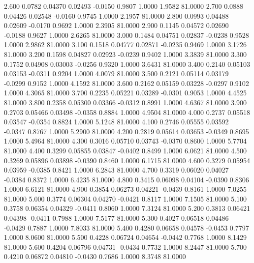    2.600   0.0782   0.04370   0.02493  -0.0150   0.9807   1.0000   1.9582  81.0000
   2.700   0.0888   0.04426   0.02548  -0.0160   0.9745   1.0000   2.1957  81.0000
   2.800   0.0993   0.04488   0.02609  -0.0170   0.9692   1.0000   2.3905  81.0000
   2.900   0.1145   0.04572   0.02690  -0.0188   0.9627   1.0000   2.6265  81.0000
   3.000   0.1484   0.04751   0.02837  -0.0238   0.9528   1.0000   2.9862  81.0000
   3.100   0.1518   0.04777   0.02871  -0.0235   0.9469   1.0000   3.1726  81.0000
   3.200   0.1598   0.04827   0.02923  -0.0239   0.9402   1.0000   3.3839  81.0000
   3.300   0.1752   0.04908   0.03003  -0.0256   0.9320   1.0000   3.6431  81.0000
   3.400   0.2140   0.05103   0.03153  -0.0311   0.9204   1.0000   4.0079  81.0000
   3.500   0.2121   0.05114   0.03179  -0.0299   0.9152   1.0000   4.1592  81.0000
   3.600   0.2162   0.05159   0.03228  -0.0297   0.9102   1.0000   4.3065  81.0000
   3.700   0.2235   0.05221   0.03289  -0.0301   0.9053   1.0000   4.4525  81.0000
   3.800   0.2358   0.05300   0.03366  -0.0312   0.8991   1.0000   4.6367  81.0000
   3.900   0.2703   0.05466   0.03498  -0.0358   0.8884   1.0000   4.9504  81.0000
   4.000   0.2737   0.05518   0.03547  -0.0354   0.8824   1.0000   5.1248  81.0000
   4.100   0.2746   0.05555   0.03592  -0.0347   0.8767   1.0000   5.2900  81.0000
   4.200   0.2819   0.05614   0.03653  -0.0349   0.8695   1.0000   5.4964  81.0000
   4.300   0.3016   0.05710   0.03743  -0.0370   0.8600   1.0000   5.7704  81.0000
   4.400   0.3299   0.05855   0.03847  -0.0402   0.8499   1.0000   6.0621  81.0000
   4.500   0.3269   0.05896   0.03898  -0.0390   0.8460   1.0000   6.1715  81.0000
   4.600   0.3279   0.05954   0.03959  -0.0385   0.8421   1.0000   6.2843  81.0000
   4.700   0.3319   0.06020   0.04027  -0.0384   0.8372   1.0000   6.4235  81.0000
   4.800   0.3415   0.06098   0.04104  -0.0390   0.8306   1.0000   6.6121  81.0000
   4.900   0.3854   0.06273   0.04221  -0.0439   0.8161   1.0000   7.0255  81.0000
   5.000   0.3774   0.06304   0.04270  -0.0421   0.8117   1.0000   7.1505  81.0000
   5.100   0.3758   0.06354   0.04329  -0.0411   0.8060   1.0000   7.3124  81.0000
   5.200   0.3813   0.06421   0.04398  -0.0411   0.7988   1.0000   7.5177  81.0000
   5.300   0.4027   0.06518   0.04486  -0.0429   0.7887   1.0000   7.8033  81.0000
   5.400   0.4280   0.06658   0.04578  -0.0453   0.7797   1.0000   8.0600  81.0000
   5.500   0.4228   0.06724   0.04654  -0.0442   0.7768   1.0000   8.1429  81.0000
   5.600   0.4204   0.06796   0.04731  -0.0434   0.7732   1.0000   8.2447  81.0000
   5.700   0.4210   0.06872   0.04810  -0.0430   0.7686   1.0000   8.3748  81.0000
